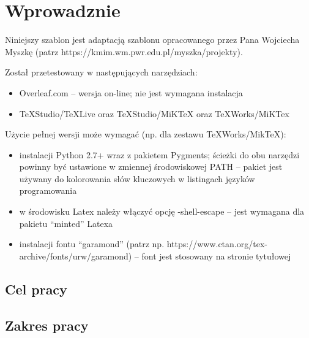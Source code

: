 
\chapter*{Wprowadznie}

Niniejszy szablon jest adaptacją szablonu opracowanego przez Pana Wojciecha Myszkę (patrz https://kmim.wm.pwr.edu.pl/myszka/projekty).

Został przetestowany w następujących narzędziach:
\begin{itemize}
\item Overleaf.com -- wersja on-line; nie jest wymagana instalacja
\item TeXStudio/TeXLive oraz TeXStudio/MiKTeX oraz TeXWorks/MiKTex
\end{itemize}

Użycie pełnej wersji może wymagać (np. dla zestawu TeXWorks/MikTeX):
\begin{itemize}
\item instalacji Python 2.7+ wraz z pakietem Pygments; ścieżki do obu narzędzi powinny być ustawione w zmiennej środowiskowej PATH -- pakiet jest używany do kolorowania słów kluczowych w listingach języków programowania
\item w środowisku Latex należy włączyć opcję -shell-escape  -- jest wymagana dla pakietu ``minted'' Latexa 
\item instalacji fontu ``garamond'' (patrz np. https://www.ctan.org/tex-archive/fonts/urw/garamond) -- font jest stosowany na stronie tytułowej
\end{itemize}

\section*{Cel pracy}

\lipsum[5]

\section*{Zakres pracy}

\lipsum[6]